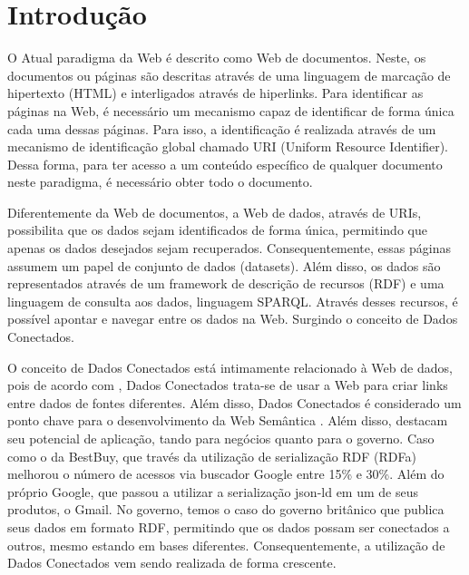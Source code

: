 \chapter{Introdução}
\label{cap:introducao}
O Atual paradigma da Web é descrito como Web de documentos. Neste, os documentos ou páginas são descritas através de uma linguagem de marcação de hipertexto (HTML) e interligados através de hiperlinks. Para identificar as páginas na Web, é necessário um mecanismo capaz de identificar de forma única cada uma dessas páginas. Para isso, a identificação é realizada através de um mecanismo de identificação global chamado URI (Uniform Resource Identifier). Dessa forma, para ter acesso a um conteúdo específico de qualquer documento neste paradigma, é necessário obter todo o documento.

Diferentemente da Web de documentos, a Web de dados, através de URIs, possibilita que os dados sejam identificados de forma única, permitindo que apenas os dados desejados sejam recuperados.  Consequentemente, essas páginas assumem um papel de conjunto de dados (datasets). Além disso, os dados são representados através de um framework de descrição de recursos (RDF) e uma linguagem de consulta aos dados, linguagem SPARQL. Através desses recursos, é possível apontar e navegar entre os dados na Web. Surgindo o conceito de Dados Conectados.

O conceito de Dados Conectados está intimamente relacionado à Web de dados, pois de acordo com , Dados Conectados trata-se de usar a Web para criar links entre dados de fontes diferentes. Além disso, Dados Conectados é considerado um ponto chave para o desenvolvimento da Web Semântica \cite{berners2001semantic} . Além disso,  destacam seu potencial de aplicação, tando para negócios quanto para o governo.  
Caso como o da BestBuy, que través da utilização de serialização RDF (RDFa) melhorou o número de acessos via buscador  Google entre 15\% e 30\%. Além do próprio Google, que passou a utilizar a serialização json-ld em um de seus produtos, o Gmail. No governo, temos o caso do governo britânico que publica seus dados em formato RDF, permitindo que os dados possam ser conectados a outros, mesmo estando em bases diferentes. Consequentemente, a utilização de Dados Conectados vem sendo realizada de forma crescente.

